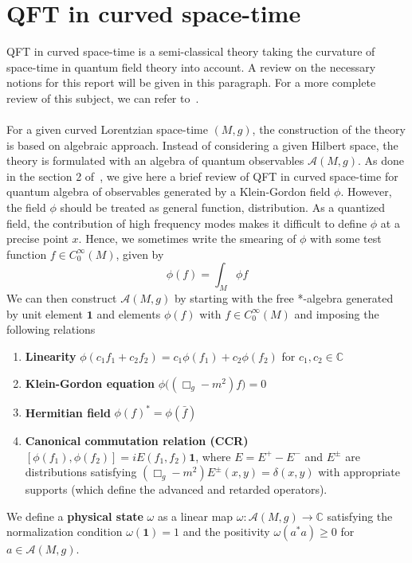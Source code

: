 \chapter{QFT in curved space-time}
QFT in curved space-time is a semi-classical theory taking the curvature of space-time in quantum field theory into account.
A review on the necessary notions for this report will be given in this paragraph.
For a more complete review of this subject, we can refer to~\cite{Hollands2014}. \\\\
%
For a given curved Lorentzian space-time $(M,g)$,
the construction of the theory is based on algebraic approach.
Instead of considering a given Hilbert space, 
the theory is formulated with an algebra of quantum observables $\mathscr{A}(M,g)$.
As done in the section 2 of~\cite{Hollands2014}, we give here a brief review of QFT in curved space-time for quantum algebra of observables generated by a Klein-Gordon field $\phi$. 
However, the field $\phi$ should be treated as general function, \ie  distribution.
As a quantized field, the contribution of high frequency modes makes it difficult to define $\phi$ at a precise point $x$.
Hence, we sometimes write the smearing of $\phi$ with some test function $f\in C^\infty_0(M)$, given by
\begin{equation*}
\phi(f) = \int_M \phi f
\end{equation*}
We can then construct $\mathscr{A}(M,g)$ by starting with the free *-algebra generated by unit element $\mathbf{1}$ and elements $\phi(f)$ with $f\in C^\infty_0(M)$ and imposing the following relations \\
\begin{enumerate}
\item \textbf{Linearity} $\phi(c_1 f_1 + c_2 f_2) = c_1 \phi(f_1) + c_2 \phi(f_2)$ for $c_1, c_2 \in \mathbb{C}$
%
\item \textbf{Klein-Gordon equation} $\phi\big( (\Box_g - m^2)f \big) = 0$
%
\item \textbf{Hermitian field} $\phi(f)^* = \phi(\bar{f})$
%
\item \textbf{Canonical commutation relation (CCR)} $[\phi(f_1), \phi(f_2)] = iE(f_1, f_2) \mathbf{1}$, where $E = E^+ - E^-$ and $E^\pm$ are distributions satisfying $(\Box_g - m^2)E^\pm(x,y) = \delta(x,y)$ with appropriate supports (which define the advanced and retarded operators).
\end{enumerate}
%
We define a \textbf{physical state} $\omega$ as a linear map
$\omega: \mathscr{A}(M,g) \rightarrow \mathbb{C}$ satisfying the normalization condition $\omega(\mathbf{1}) = 1$ and the positivity $\omega(a^*a) \geq 0$ for $a\in\mathscr{A}(M,g)$.
